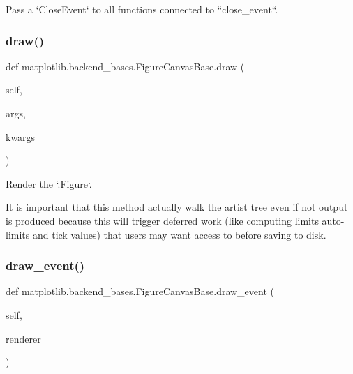 \begin{DoxyVerb}Pass a `CloseEvent` to all functions connected to ``close_event``.
\end{DoxyVerb}
 \mbox{\label{classmatplotlib_1_1backend__bases_1_1FigureCanvasBase_a22552de97fd78cabaa05adb20daa92e2}} 
\subsubsection{\texorpdfstring{draw()}{draw()}}
{\footnotesize\ttfamily def matplotlib.\+backend\+\_\+bases.\+Figure\+Canvas\+Base.\+draw (\begin{DoxyParamCaption}\item[{}]{self,  }\item[{}]{args,  }\item[{}]{kwargs }\end{DoxyParamCaption})}

\begin{DoxyVerb}Render the `.Figure`.

It is important that this method actually walk the artist tree
even if not output is produced because this will trigger
deferred work (like computing limits auto-limits and tick
values) that users may want access to before saving to disk.
\end{DoxyVerb}
 \mbox{\label{classmatplotlib_1_1backend__bases_1_1FigureCanvasBase_a8af192a22fb405b82e720c97c4e8144a}} 
\subsubsection{\texorpdfstring{draw\+\_\+event()}{draw\_event()}}
{\footnotesize\ttfamily def matplotlib.\+backend\+\_\+bases.\+Figure\+Canvas\+Base.\+draw\+\_\+event (\begin{DoxyParamCaption}\item[{}]{self,  }\item[{}]{renderer }\end{DoxyParamCaption})}

